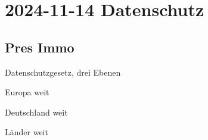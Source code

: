 \section{2024-11-14 Datenschutz}

\subsection{Pres Immo}

\startitemize[packed]
\item Datenschutzgesetz, drei Ebenen
\startitemize[packed,m]
\item Europa weit
\item Deutschland weit
\item Länder weit
\stopitemize
\stopitemize


